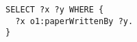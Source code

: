 \begin{minipage}{0.5\linewidth}
\begin{lstlisting}
SELECT ?x ?y WHERE {
  ?x o1:paperWrittenBy ?y.
}
\end{lstlisting}
\end{minipage}